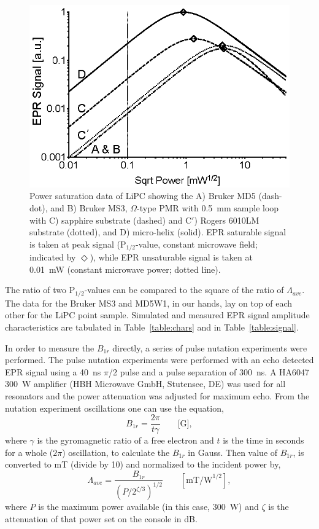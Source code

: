 \begin{figure}[htbp]
\centering
\includegraphics{Kapitel/Appendix/Images/S4-LiPCPowerSat.eps}
\caption[Power saturation data of LiPC comparing resonators.]{Power saturation data of LiPC showing the A) Bruker MD5 (dash-dot), and B) Bruker MS3, $\Omega$-type PMR with 0.5~mm sample loop with C) sapphire substrate (dashed) and C$'$) Rogers 6010LM substrate (dotted), and D) micro-helix (solid). EPR saturable signal is taken at peak signal (P$_{1/2}$-value, constant microwave field; indicated by $\Diamond$), while EPR unsaturable signal is taken at 0.01~mW (constant microwave power; dotted line).}
\label{fig:lipcpwrsat}
\end{figure}

The ratio of two P$_{1/2}$-values can be compared to the square of the ratio of $\Lambda_{ave}$. The data for the Bruker MS3 and MD5W1, in our hands, lay on top of each other for the LiPC point sample. Simulated and measured EPR signal amplitude characteristics are tabulated in Table~\ref{table:chars} and in Table~\ref{table:signal}. 

In order to measure the $B_{1r}$ directly, a series of pulse nutation experiments were performed. \cite{schweiger2001principles} The pulse nutation experiments were performed with an echo detected EPR signal using a 40~ns $\pi$/2 pulse and a pulse separation of 300~ns. A HA6047 300~W amplifier (HBH Microwave GmbH, Stutensee, DE) was used for all resonators and the power attenuation was adjusted for maximum echo. From the nutation experiment oscillations one can use the equation,
\begin{equation}
 B_{1r} = \frac{2 \pi}{t \gamma} \qquad \text{[G]},
\end{equation}
where $\gamma$ is the gyromagnetic ratio of a free electron and $t$ is the time in seconds for a whole ($2\pi$) oscillation, to calculate the  $B_{1r}$ in Gauss. Then value of $B_{1r}$, is converted to mT (divide by 10) and normalized to the incident power by,
\begin{equation}
\Lambda_{ave} = \frac{B_{1r}}{(P/2^{\zeta/3})^{1/2}}\qquad [\text{mT/W}^{1/2}],
\end{equation}
where $P$ is the maximum power available (in this case, 300~W) and $\zeta$ is the attenuation of that power set on the console in dB. 

